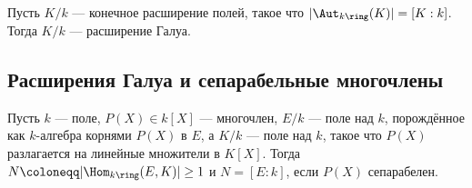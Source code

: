 \documentclass[
	extrafontsizes,
	11pt,
	hyphens,
]{memoir}
\begin{document}
\begin{corollary}
Пусть \(K/k\) --- конечное расширение полей, такое что \(\lvert \Aut_{k\ring}(K) \rvert = [K : k]\).%
\label{cor:MaxSymGalExt}
Тогда \(K/k\) --- расширение Галуа.
\end{corollary}


\subsection{Расширения Галуа и сепарабельные многочлены}

%
%

\begin{theorem}
Пусть \(k\) --- поле, \(P(X) \in k[X]\) --- многочлен, \(E/k\) --- поле над \(k\), порождённое как \(k\)-алгебра корнями \(P(X)\) 	в \(E\), а \(K/k\) --- поле над \(k\), такое что \(P(X)\) разлагается на линейные множители в \(K[X]\).
Тогда \(N \coloneqq \lvert \Hom_{k\ring}(E,K) \rvert \geq 1\) и \(N = [E : k]\), если \(P(X)\) сепарабелен.
\end{theorem}
\end{document}
